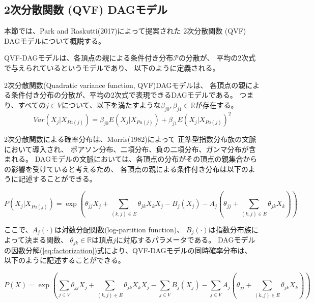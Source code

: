 
\subsection{2次分散関数 (QVF) DAGモデル}

本節では、Park and Raskutti(2017)\cite{Park2017-hw}によって提案された
2次分散関数 (QVF) DAGモデルについて概説する。

QVF-DAGモデルは、各頂点の親による条件付き分布$\mathcal P$の分散が、
平均の2次式で与えられているというモデルであり、
以下のように定義される。

\begin{df}
2次分散関数(Quadratic variance function, QVF)DAGモデルは、
各頂点の親による条件付き分布の分散が、平均の2次式で表現できるDAGモデルである。
つまり、すべての$j \in V$について、以下を満たすような$\beta_{j0}, \beta_{j1} \in \mathbb R$が存在する。
\begin{equation}
\mathit{Var}(X_j|X_{Pa(j)}) = \beta_{j0} E(X_j | X_{Pa(j)}) + \beta_{j1} E(X_j | X_{Pa(j)})^2
\end{equation}
\end{df}

2次分散関数による確率分布は、Morris(1982)\cite{Morris1982-nc}によって
正準型指数分布族の文脈において導入され、
ポアソン分布、二項分布、負の二項分布、ガンマ分布が含まれる。
DAGモデルの文脈においては、各頂点の分布がその頂点の親集合からの影響を受けていると考えるため、
各頂点の親による条件付き分布は以下のように記述することができる。

\begin{equation}
  P(X_j|X_{Pa(j)}) = \exp \left( \theta_{jj}X_j  + \sum_{(k,j)\in E} \theta_{jk}X_k X_j -
  B_j(X_j) - A_j \left( \theta_{jj} + \sum_{(k,j) \in E} \theta_{jk} X_k \right) \right)
\end{equation}

ここで、$A_j(\cdot)$は対数分配関数(log-partition function)、
$B_j(\cdot)$は指数分布族によって決まる関数、
$\theta_{jk}\in \mathbb R$は頂点$j$に対応するパラメータである。
DAGモデルの因数分解(\ref{eq:factorization})式により、QVF-DAGモデルの同時確率分布は、
以下のように記述することができる。

\begin{equation}
  P(X) = \exp \left( \sum_{j\in V} \theta_{jj}X_j + \sum_{(k,j)\in E} \theta_{jk}X_k X_j
  - \sum_{j \in V} B_j(X_j) - \sum_{j \in V} A_j
  \left( \theta_{jj} + \sum_{(k,j)\in E} \theta_{jk} X_k \right)\right)
\end{equation}
